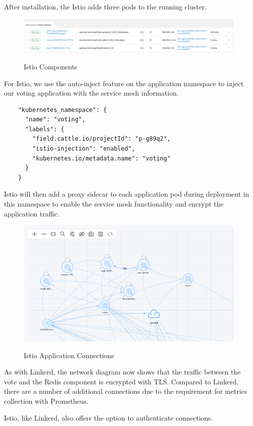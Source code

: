 After installation, the Istio adds three pods to the running cluster.

\begin{figure}[H]
\centering
\caption {Istio Components}
\includegraphics[width=\linewidth]{images/istio-pods.png}
\label{fig:istioPods}
\end{figure}

For Istio, we use the auto-inject feature on the application namespace to inject our voting application with the service mesh information.

\begin{verbatim}
    "kubernetes_namespace": {
      "name": "voting",
      "labels": {
        "field.cattle.io/projectId": "p-g89q2",
        "istio-injection": "enabled",
        "kubernetes.io/metadata.name": "voting"
      }
    }
\end{verbatim}

Istio will then add a proxy sidecar to each application pod during deployment in this namespace to enable the service mesh functionality and encrypt the application traffic.

\begin{figure}[H]
\centering
\caption {Istio Application Connections}
\includegraphics[width=\linewidth]{images/istio-map.png}
\label{fig:IstioMap}
\end{figure}

As with Linkerd, the network diagram now shows that the traffic between the vote and the Redis component is encrypted with TLS. Compared to Linkerd, there are a number of additional connections due to the requirement for metrics collection with Prometheus.

Istio, like Linkerd, also offers the option to authenticate connections.
